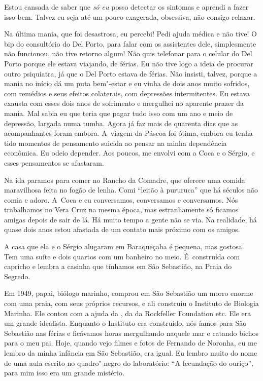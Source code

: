 Estou cansada de saber que \emph{só eu} posso detectar os sintomas e
aprendi a fazer isso bem. Talvez eu seja até um pouco exagerada,
obsessiva, não consigo relaxar.

Na última mania, que foi desastrosa, eu percebi! Pedi ajuda médica e não
tive! O bip do consultório do Del Porto, para falar com os assistentes
dele, simplesmente não funcionou, não tive retorno algum! Não quis
telefonar para o celular do Del Porto porque ele estava viajando, de
férias. Eu não tive logo a ideia de procurar outro psiquiatra, já que o
Del Porto estava de férias. Não insisti, talvez, porque a mania no
início dá um puta bem"-estar e eu vinha de dois anos muito sofridos, com
remédios e seus efeitos colaterais, com depressões intermitentes. Eu
estava exausta com esses dois anos de sofrimento e mergulhei no aparente
prazer da mania. Mal sabia eu que teria que pagar tudo isso com um ano e
meio de depressão, largada numa tumba. Agora já faz mais de quarenta
dias que as acompanhantes foram embora. A~viagem da Páscoa foi ótima,
embora eu tenha tido momentos de pensamento suicida ao pensar na minha
dependência econômica. Eu odeio depender. Aos poucos, me envolvi com a
Coca e o Sérgio, e esses pensamentos se afastaram.

Na ida paramos para comer no Rancho da Comadre, que oferece uma comida
maravilhosa feita no fogão de lenha. Comi ``leitão à pururuca'' que há
séculos não comia e adoro. A~Coca e eu conversamos, conversamos e
conversamos. Nós trabalhamos no Vera Cruz na mesma época, mas
estranhamente só ficamos amigas depois de sair de lá. Há muito tempo a
gente não se via. Na realidade, há quase dois anos estou afastada de um
contato mais próximo com os amigos.

A casa que ela e o Sérgio alugaram em Baraqueçaba é pequena, mas
gostosa. Tem uma suíte e dois quartos com um banheiro no meio. É~construída com capricho e lembra a casinha que tínhamos em São
Sebastião, na Praia do Segredo.

Em 1949, papai, biólogo marinho, comprou em São Sebastião um morro
enorme com uma praia, com seus próprios recursos, e ali construiu o
Instituto de Biologia Marinha. Ele contou com a ajuda da , da
 da Rockfeller Foundation etc. Ele era um grande idealista.
Enquanto o Instituto era construído, nós íamos para São Sebastião nas
férias e ficávamos horas mergulhando naquele mar e catando bichos para o
meu pai. Hoje, quando vejo filmes e fotos de Fernando de Noronha, eu me
lembro da minha infância em São Sebastião, era igual. Eu lembro muito do
nome de uma aula escrito no quadro"-negro do laboratório: ``A fecundação
do ouriço'', para mim isso era um grande mistério.

